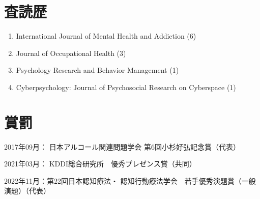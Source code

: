 \documentclass[11pt,a4paper]{article}
\begin{document}
\section{査読歴}
	\begin{enumerate}
	\item International Journal of Mental Health and Addiction (6)
	\item Journal of Occupational Health (3)
	\item Psychology Research and Behavior Management (1)
	\item Cyberpsychology: Journal of Psychosocial Research on Cyberspace (1)
\end{enumerate}
\section{賞罰}
\begin{description}
	\item 2017年09月： 日本アルコール関連問題学会 第6回小杉好弘記念賞（代表）
	\item 2021年03月： KDDI総合研究所　優秀プレゼンス賞（共同）
	\item 2022年11月：第22回日本認知療法・	認知行動療法学会　若手優秀演題賞（一般演題）（代表）
\end{description}
\end{document}
